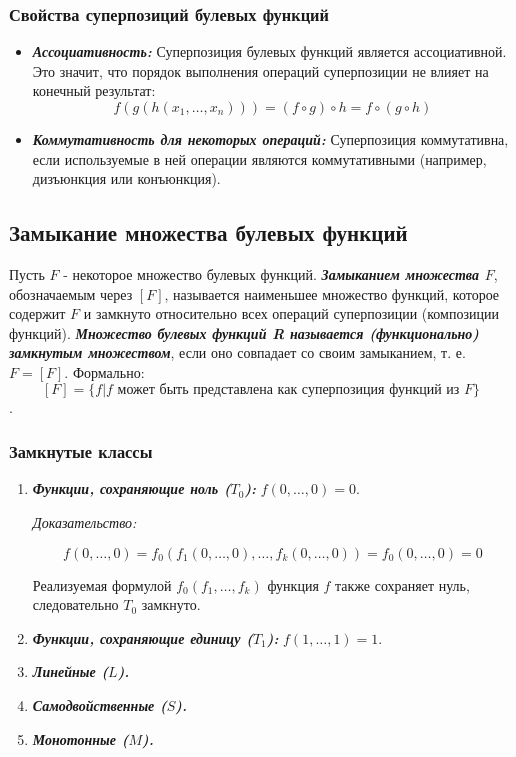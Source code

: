 \documentclass[12pt,letterpaper]{article}
\begin{document}
\subsubsection{Свойства суперпозиций булевых функций}

\begin{itemize}
  \item \textbf{\emph{Ассоциативность:}} Суперпозиция булевых функций является ассоциативной. Это значит, что порядок выполнения операций суперпозиции не влияет на конечный результат:
  \[f(g(h(x_1, \ldots, x_n))) = (f \circ g) \circ h = f \circ (g \circ h)\]
  \item \textbf{\emph{Коммутативность для некоторых операций:}} Суперпозиция коммутативна, если используемые в ней операции являются коммутативными (например, дизъюнкция или конъюнкция).
\end{itemize}

\subsection{Замыкание множества булевых функций}

Пусть \(F\) - некоторое множество булевых функций. \textbf{\emph{Замыканием множества \(F\)}}, обозначаемым через  \(\left[ F \right]\), называется наименьшее множество функций, которое содержит \(F\) и замкнуто относительно всех операций суперпозиции (композиции функций). \textbf{\emph{Множество булевых функций R называется (функционально) замкнутым множеством}}, если оно совпадает со своим замыканием, т. е. \(F = \left[ F \right]\).
Формально:
\[\left[ F \right] = \{f \vert f \mbox{ может быть представлена как суперпозиция функций из } F\}\].

\subsubsection{Замкнутые классы}

\begin{enumerate}
  \item \textbf{\emph{Функции, сохраняющие ноль (\(T_0\)):}} \(f(0, \ldots, 0) = 0\).

  \textit{Доказательство:}

  \[f(0, \ldots, 0) = f_0(f_1(0, \ldots, 0), \ldots, f_k(0, \ldots, 0)) = f_0(0, \ldots, 0) = 0\]

  Реализуемая формулой \(f_0(f_1, \ldots, f_k)\) функция \(f\) также сохраняет нуль, следовательно \(T_0\) замкнуто.

  \item \textbf{\emph{Функции, сохраняющие единицу (\(T_1\)):}} \(f(1, \ldots, 1) = 1\).
  \item \textbf{\emph{Линейные (\(L\)).}}
  \item \textbf{\emph{Самодвойственные (\(S\)).}}
  \item \textbf{\emph{Монотонные (\(M\)).}}
\end{enumerate}
\end{document}
